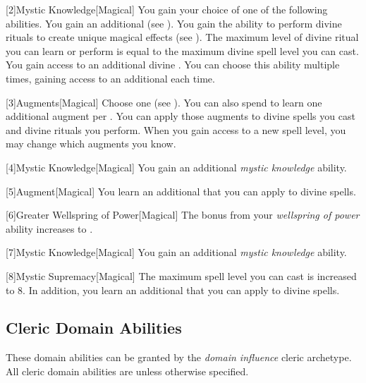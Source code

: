         [2]{Mystic Knowledge}[Magical]
        You gain your choice of one of the following abilities.
        {
             You gain an additional  (see ).
             You gain the ability to perform divine rituals to create unique magical effects (see ).
            The maximum level of divine ritual you can learn or perform is equal to the maximum divine spell level you can cast.
             You gain access to an additional divine .
                You can choose this ability multiple times, gaining access to an additional  each time.
        }

        [3]{Augments}[Magical]
        Choose one  (see ).
        You can also spend  to learn one additional augment per .
        You can apply those augments to divine spells you cast and divine rituals you perform.
        When you gain access to a new spell level, you may change which augments you know.

        [4]{Mystic Knowledge}[Magical]
        You gain an additional \textit{mystic knowledge} ability.

        [5]{Augment}[Magical]
        You learn an additional  that you can apply to divine spells.

        [6]{Greater Wellspring of Power}[Magical]
        The bonus from your \textit{wellspring of power} ability increases to .

        [7]{Mystic Knowledge}[Magical]
        You gain an additional \textit{mystic knowledge} ability.

        [8]{Mystic Supremacy}[Magical]
        The maximum spell level you can cast is increased to 8.
        In addition, you learn an additional  that you can apply to divine spells.

    \subsection{Cleric Domain Abilities}\label{Cleric Domain Abilities}
        These domain abilities can be granted by the \textit{domain influence} cleric archetype.
        All cleric domain abilities are  unless otherwise specified.

